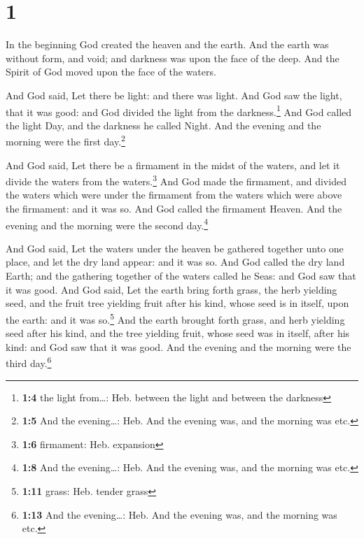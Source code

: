 \hypertarget{section}{%
\section{1}\label{section}}

 In the beginning God created the heaven and the earth.
 And the earth was without form, and void; and darkness
was upon the face of the deep. And the Spirit of God moved upon the face
of the waters.

 And God said, Let there be light: and there was light.
 And God saw the light, that it was good: and God divided
the light from the darkness.\footnote{\textbf{1:4} the light from\ldots:
  Heb. between the light and between the darkness}  And
God called the light Day, and the darkness he called Night. And the
evening and the morning were the first day.\footnote{\textbf{1:5} And
  the evening\ldots: Heb. And the evening was, and the morning was etc.}

 And God said, Let there be a firmament in the midst of
the waters, and let it divide the waters from the waters.\footnote{\textbf{1:6}
  firmament: Heb. expansion}  And God made the firmament,
and divided the waters which were under the firmament from the waters
which were above the firmament: and it was so.  And God
called the firmament Heaven. And the evening and the morning were the
second day.\footnote{\textbf{1:8} And the evening\ldots: Heb. And the
  evening was, and the morning was etc.}

 And God said, Let the waters under the heaven be gathered
together unto one place, and let the dry land appear: and it was so.
 And God called the dry land Earth; and the gathering
together of the waters called he Seas: and God saw that it was good.
 And God said, Let the earth bring forth grass, the herb
yielding seed, and the fruit tree yielding fruit after his kind, whose
seed is in itself, upon the earth: and it was so.\footnote{\textbf{1:11}
  grass: Heb. tender grass}  And the earth brought forth
grass, and herb yielding seed after his kind, and the tree yielding
fruit, whose seed was in itself, after his kind: and God saw that it was
good.  And the evening and the morning were the third
day.\footnote{\textbf{1:13} And the evening\ldots: Heb. And the evening
  was, and the morning was etc.}

